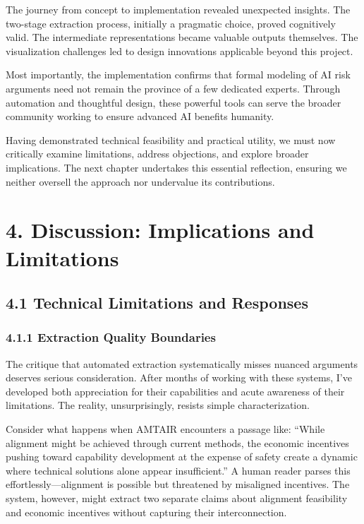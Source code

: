 \documentclass[
  11pt,
  letterpaper,
  openany]{book}
\begin{document}
The journey from concept to implementation revealed unexpected insights.
The two-stage extraction process, initially a pragmatic choice, proved
cognitively valid. The intermediate representations became valuable
outputs themselves. The visualization challenges led to design
innovations applicable beyond this project.

Most importantly, the implementation confirms that formal modeling of AI
risk arguments need not remain the province of a few dedicated experts.
Through automation and thoughtful design, these powerful tools can serve
the broader community working to ensure advanced AI benefits humanity.

Having demonstrated technical feasibility and practical utility, we must
now critically examine limitations, address objections, and explore
broader implications. The next chapter undertakes this essential
reflection, ensuring we neither oversell the approach nor undervalue its
contributions.


\chapter{4. Discussion: Implications and
Limitations}\label{sec-discussion}

\section{4.1 Technical Limitations and
Responses}\label{sec-technical-limitations}

\subsection{4.1.1 Extraction Quality
Boundaries}\label{sec-extraction-boundaries}

The critique that automated extraction systematically misses nuanced
arguments deserves serious consideration. After months of working with
these systems, I've developed both appreciation for their capabilities
and acute awareness of their limitations. The reality, unsurprisingly,
resists simple characterization.

Consider what happens when AMTAIR encounters a passage like: ``While
alignment might be achieved through current methods, the economic
incentives pushing toward capability development at the expense of
safety create a dynamic where technical solutions alone appear
insufficient.'' A human reader parses this effortlessly---alignment is
possible but threatened by misaligned incentives. The system, however,
might extract two separate claims about alignment feasibility and
economic incentives without capturing their interconnection.
\end{document}
